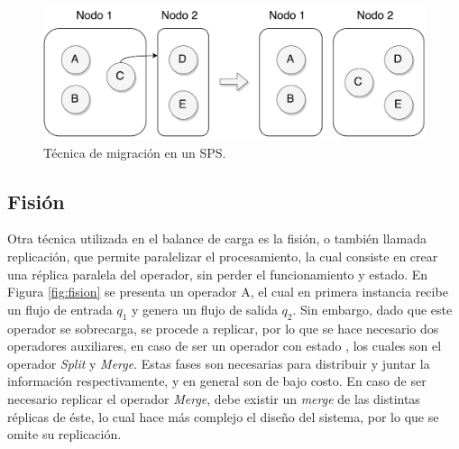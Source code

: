\begin{figure}[!ht]
	\centering
	\includegraphics[scale=0.45]{images/Migracion.pdf}
	\caption{T\'ecnica de migraci\'on en un SPS.}
	\label{fig:migracion}
\end{figure}

\subsection{Fisi\'on}
\label{sec:fisionBC}


Otra t\'ecnica utilizada en el balance de carga es la fisi\'on, o tambi\'en llamada replicaci\'on, que permite paralelizar el procesamiento, la cual consiste en crear una r\'eplica paralela del operador, sin perder el funcionamiento y estado. En Figura \ref{fig:fision} se presenta un operador A, el cual en primera instancia recibe un flujo de entrada $q_1$ y genera un flujo de salida $q_2$. Sin embargo, dado que este operador se sobrecarga, se procede a replicar, por lo que se hace necesario dos operadores auxiliares, \normalsize{en caso de ser un operador con estado} \citep{WuKWO12}, los cuales son el operador \textit{Split} y \textit{Merge}. Estas fases son necesarias para distribuir y juntar la informaci\'on respectivamente, y en general son de bajo costo. En caso de ser necesario replicar el operador \textit{Merge}, debe existir un \textit{merge} de las distintas r\'eplicas de \'este, lo cual hace m\'as complejo el dise\~no del sistema, por lo que se omite su replicaci\'on.

